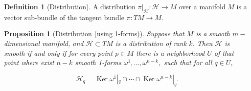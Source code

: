 \documentclass [xcolor=svgnames, t] {beamer}
\theoremstyle{definition}
\newtheorem{df}{Definition}
\theoremstyle{plain}
\newtheorem{prop}{Proposition}
\theoremstyle{remark}
\begin{document}
\begin{frame}[fragile]
	\begin{df}[Distribution]
		A distribution $ \pi|_{ \mathcal{H}}:\mathcal{H} \rightarrow M $ over a manifold $ M $ is a vector sub-bundle of the tangent bundle $ \pi:TM \rightarrow M. $ 
		\begin{center}
		\end{center}
	\end{df}
\begin{prop}[Distribution (using 1-forms)]
	Suppose that $ M $ is a smooth $ m- $dimensional manifold, and $ \mathcal{H} \subset TM$ is a distribution of rank $k$. Then $ \mathcal{H} $ is smooth if and only if for every point $ p\in M $ there is a neighborhood $ U $ of that point where exist $n-k$ smooth 1-forms $ \omega^1,\dots,\omega^{n-k}, $ such that for all $ q\in U $,

	$$ \mathcal{H}_q = \operatorname{Ker} \omega^1|_q\cap \cdots \cap\operatorname{Ker} \omega^{n-k}|_q.  $$ 
\end{prop}
\end{frame}
\end{document}
